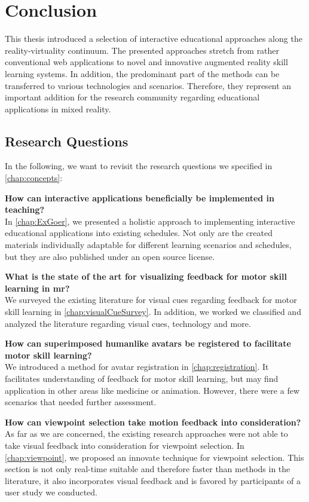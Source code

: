 %
\chapter{Conclusion}
\label{chap:conclusion}

This thesis introduced a selection of interactive educational approaches along the reality-virtuality continuum.
The presented approaches stretch from rather conventional web applications to novel and innovative augmented reality skill learning systems. In addition, the predominant part of the methods can be transferred to various technologies and scenarios. Therefore, they represent an important addition for the research community regarding educational applications in mixed reality. 

\section{Research Questions \label{sec:questions}}
In the following, we want to revisit the research questions we specified in \autoref{chap:concepts}:

\textbf{How can interactive applications beneficially be implemented in teaching?}\\
In \autoref{chap:ExGoer}, we presented a holistic approach to implementing interactive educational applications into existing schedules.
Not only are the created materials individually adaptable for different learning scenarios and schedules, but they are also published under an open source license.

\textbf{What is the state of the art for visualizing feedback for motor skill learning in \acrlong{mr}?}\\
We surveyed the existing literature for visual cues regarding feedback for motor skill learning in \autoref{chap:visualCueSurvey}. In addition, we worked we classified and analyzed the literature regarding visual cues, technology and more.

\textbf{How can superimposed humanlike avatars be registered to facilitate motor skill learning?}\\
We introduced a method for avatar registration in \autoref{chap:registration}. It facilitates understanding of feedback for motor skill learning, but may find application in other areas like medicine or animation. However, there were a few scenarios that needed further assessment.

\textbf{How can viewpoint selection take motion feedback into consideration?}\\
As far as we are concerned, the existing research approaches were not able to take visual feedback into consideration for viewpoint selection. In \autoref{chap:viewpoint}, we proposed an innovate technique for viewpoint selection. This section is not only real-time suitable and therefore faster than methods in the literature, it also incorporates visual feedback and is favored by participants of a user study we conducted.

